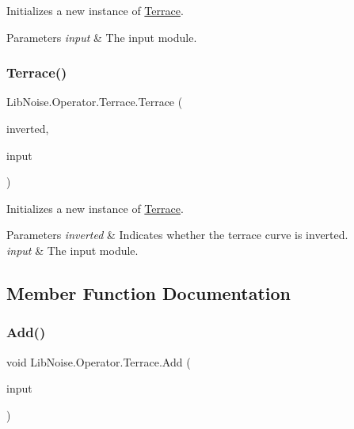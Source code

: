 Initializes a new instance of \hyperlink{class_lib_noise_1_1_operator_1_1_terrace}{Terrace}. 


\begin{DoxyParams}{Parameters}
{\em input} & The input module.\\
\hline
\end{DoxyParams}
\mbox{\label{class_lib_noise_1_1_operator_1_1_terrace_a90908c6f5e64b1203087e3e94415cd8a}} 
\subsubsection{\texorpdfstring{Terrace()}{Terrace()}\hspace{0.1cm}{\footnotesize\ttfamily [3/3]}}
{\footnotesize\ttfamily Lib\+Noise.\+Operator.\+Terrace.\+Terrace (\begin{DoxyParamCaption}\item[{bool}]{inverted,  }\item[{\hyperlink{class_lib_noise_1_1_module_base}{Module\+Base}}]{input }\end{DoxyParamCaption})}



Initializes a new instance of \hyperlink{class_lib_noise_1_1_operator_1_1_terrace}{Terrace}. 


\begin{DoxyParams}{Parameters}
{\em inverted} & Indicates whether the terrace curve is inverted.\\
\hline
{\em input} & The input module.\\
\hline
\end{DoxyParams}


\subsection{Member Function Documentation}
\mbox{\label{class_lib_noise_1_1_operator_1_1_terrace_a407835dc6f74c500cb3d5c2e1fbf820d}} 
\subsubsection{\texorpdfstring{Add()}{Add()}}
{\footnotesize\ttfamily void Lib\+Noise.\+Operator.\+Terrace.\+Add (\begin{DoxyParamCaption}\item[{double}]{input }\end{DoxyParamCaption})}



